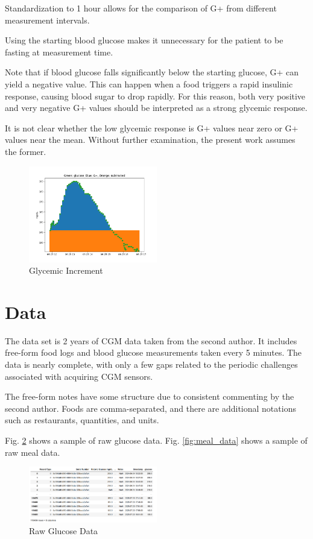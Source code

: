 \documentclass[conference]{IEEEtran}
\begin{document}
Standardization to 1 hour allows for the comparison of G+ from different measurement intervals.

Using the starting blood glucose makes it unnecessary for the patient to be fasting at measurement time.

Note that if blood glucose falls significantly below the starting glucose, G+ can yield a negative value. This can happen when a food triggers a rapid insulinic response, causing blood sugar to drop rapidly. For this reason, both very positive and very negative G+ values should be interpreted as a strong glycemic response.

It is not clear whether the low glycemic response is G+ values near zero or G+ values near the mean. Without further examination, the present work assumes the former.

\begin{figure}[tbp]
    \includegraphics[width=0.5\textwidth]{images/gplus_illustrated.png}
    \caption{Glycemic Increment}
    \label{fig:gplus_illustrated}
\end{figure}

\section{Data}

The data set is 2 years of CGM data taken from the second author. It includes free-form food logs and blood glucose measurements taken every 5 minutes. The data is nearly complete, with only a few gaps related to the periodic challenges associated with acquiring CGM sensors.

The free-form notes have some structure due to consistent commenting by the second author. Foods are comma-separated, and there are additional notations such as restaurants, quantities, and units.

Fig. \ref{fig:glucose_data} shows a sample of raw glucose data.  Fig. \ref{fig:meal_data} shows a sample of raw meal data.

\begin{figure}[tbp]
    \includegraphics[width=0.5\textwidth]{images/glucose_data.png}
    \caption{Raw Glucose Data}    \label{fig:glucose_data}
\end{figure}
\end{document}
